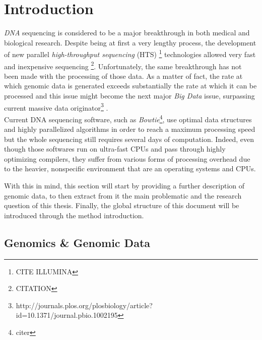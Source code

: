 
\chapter{Introduction} %

\label{Chapter1} %



\textit{DNA} sequencing is considered to be a major breakthrough in both medical and biological research. Despite being at first a very lengthy process, the development of new parallel \textit{high-throughput sequencing} (HTS) \footnote{CITE ILLUMINA} technologies allowed very fast and inexpensive sequencing \footnote{CITATION}. Unfortunately, the same breakthrough has not been made with the processing of those data. 
As a matter of fact, the rate at which genomic data is generated exceeds substantially the rate at which it can be processed and this issue might become the next major \textsl{Big Data} issue, surpassing current massive data originator\footnote{http://journals.plos.org/plosbiology/article?id=10.1371/journal.pbio.1002195} .\\

Current DNA sequencing software, such as \textit{Bowtie}\footnote{citer}, use optimal data structures and highly parallelized algorithms in order to reach a maximum processing speed but the whole sequencing still requires several days of computation. Indeed, even though those softwares run on ultra-fast CPUs and pass through highly optimizing compilers, they suffer from various forms of processing overhead due to the heavier, nonspecific environment that are an operating systems and CPUs.

With this in mind, this section will start by providing a further description of genomic data, to then extract from it the main problematic and the research question of this thesis. Finally, the global structure of this document will be introduced through the method introduction.

\section{Genomics \& Genomic Data}

